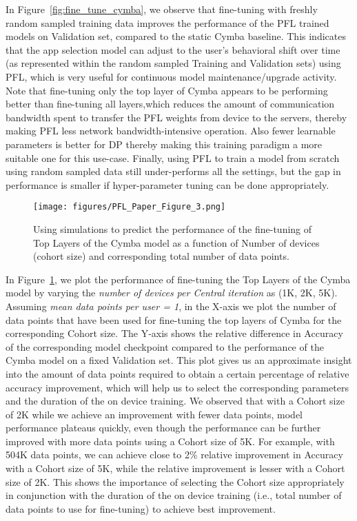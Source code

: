 In Figure~\ref{fig:fine_tune_cymba}, we observe that fine-tuning with freshly random sampled training data improves the performance of the PFL trained models on Validation set, compared to the static Cymba baseline. 
This indicates that the app selection model can adjust to the user's behavioral shift over time (as represented within the random sampled Training and Validation sets) using PFL, which is very useful for continuous model maintenance/upgrade activity.
Note that fine-tuning only the top layer of Cymba appears to be performing better than fine-tuning all layers,which reduces the amount of communication bandwidth spent to transfer the PFL weights from device to the servers, thereby making PFL less network bandwidth-intensive operation. Also fewer learnable parameters is better for DP thereby making this training paradigm a more suitable one for this use-case.
Finally, using PFL to train a model from scratch using random sampled data still under-performs all the settings, but the gap in performance is smaller if hyper-parameter tuning can be done appropriately.



\begin{figure}
\centering
\texttt{[image: figures/PFL\_Paper\_Figure\_3.png]}
\caption{Using simulations to predict the performance of the fine-tuning of Top Layers of the Cymba model as a function of Number of devices (cohort size) and corresponding total number of data points.}
\label{fig:data_req_for_tuning}
\end{figure}

In Figure~\ref{fig:data_req_for_tuning}, we plot the performance of fine-tuning the Top Layers of the Cymba model by varying the \textit{number of devices per Central iteration} as (1K, 2K, 5K). Assuming \textit{mean data points per user = 1}, in the X-axis we plot the number of data points that have been used for fine-tuning the top layers of Cymba for the corresponding Cohort size. The Y-axis shows the relative difference in Accuracy of the corresponding model checkpoint compared to the performance of the Cymba model on a fixed Validation set. This plot gives us an approximate insight into the amount of data points required to obtain a certain percentage of relative accuracy improvement, which will help us to select the corresponding parameters and the duration of the on device training. We observed that with a Cohort size of 2K while we achieve an improvement with fewer data points, model performance plateaus quickly, even though the performance can be further improved with more data points using a Cohort size of 5K. For example, with 504K data points, we can achieve close to 2\% relative improvement in Accuracy with a Cohort size of 5K, while the relative improvement is lesser with a Cohort size of 2K. This shows the importance of selecting the Cohort size appropriately in conjunction with the duration of the on device training (i.e., total number of data points to use for fine-tuning) to achieve best improvement.



